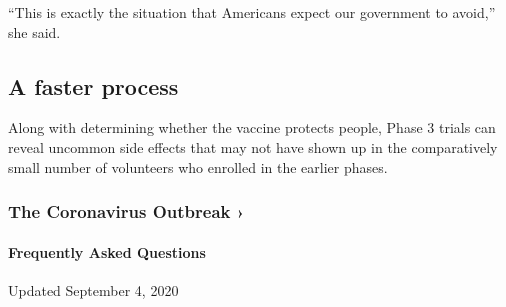 ``This is exactly the situation that Americans expect our government to
avoid,'' she said.

\hypertarget{a-faster-process}{%
\subsection{A faster process}\label{a-faster-process}}

Along with determining whether the vaccine protects people, Phase 3
trials can reveal uncommon side effects that may not have shown up in
the comparatively small number of volunteers who enrolled in the earlier
phases.

\href{https://www.nytimes3xbfgragh.onion/news-event/coronavirus?action=click\&pgtype=Article\&state=default\&region=MAIN_CONTENT_3\&context=storylines_faq}{}

\hypertarget{the-coronavirus-outbreak-}{%
\subsubsection{The Coronavirus Outbreak
›}\label{the-coronavirus-outbreak-}}

\hypertarget{frequently-asked-questions}{%
\paragraph{Frequently Asked
Questions}\label{frequently-asked-questions}}

Updated September 4, 2020

